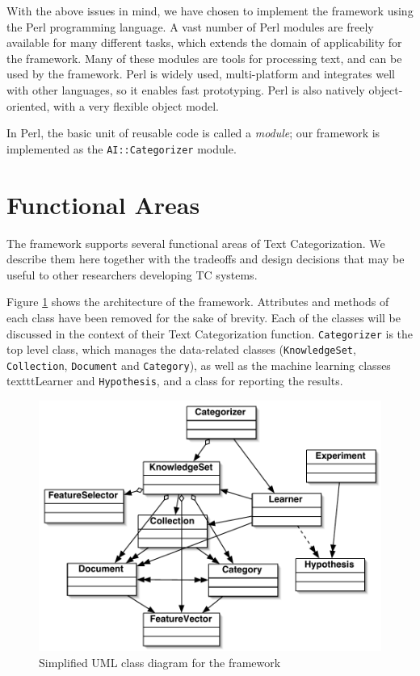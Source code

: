 \documentclass[a4paper,twocolumn]{article}
\begin{document}
With the above issues in mind, we have chosen to implement the
framework using the Perl programming language. \cite{Wall:00} A vast
number of Perl modules are freely available for many different tasks,
which extends the domain of applicability for the framework. Many of
these modules are tools for processing text, and can be used by the
framework. Perl is widely used, multi-platform and integrates well
with other languages, so it enables fast prototyping. Perl is also
natively object-oriented, with a very flexible object
model. \cite{conway:99}

In Perl, the basic unit of reusable code is called a \emph{module};
our framework is implemented as the \texttt{AI::Categorizer} module.

\section{Functional Areas}

The framework supports several functional areas of Text
Categorization. We describe them here together with the tradeoffs and
design decisions that may be useful to other researchers developing TC
systems.

Figure \ref{classes-uml} shows the architecture of the
framework. Attributes and methods of each class have been removed for
the sake of brevity. Each of the classes will be discussed in the
context of their Text Categorization function. \texttt{Categorizer} is
the top level class, which manages the data-related classes
(\texttt{KnowledgeSet}, \texttt{Collection}, \texttt{Document} and
\texttt{Category}), as well as the machine learning classes
texttt{Learner} and \texttt{Hypothesis}, and a class for reporting the
results.


\begin{figure}
\includegraphics[width=\linewidth]{classes-uml.pdf}
\caption{Simplified UML class diagram for the framework}
\label{classes-uml}
\end{figure}
\end{document}
